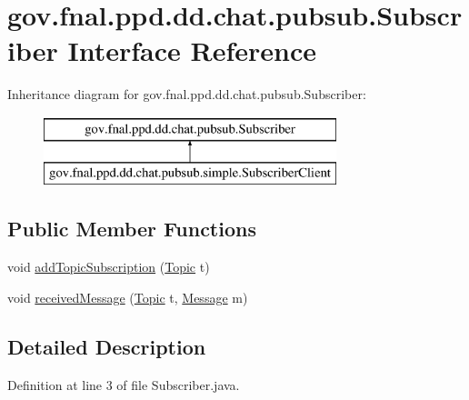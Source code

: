 \hypertarget{interfacegov_1_1fnal_1_1ppd_1_1dd_1_1chat_1_1pubsub_1_1Subscriber}{\section{gov.\-fnal.\-ppd.\-dd.\-chat.\-pubsub.\-Subscriber Interface Reference}
\label{interfacegov_1_1fnal_1_1ppd_1_1dd_1_1chat_1_1pubsub_1_1Subscriber}
}
Inheritance diagram for gov.\-fnal.\-ppd.\-dd.\-chat.\-pubsub.\-Subscriber\-:\begin{figure}[H]
\begin{center}
\leavevmode
\includegraphics[height=2.000000cm]{interfacegov_1_1fnal_1_1ppd_1_1dd_1_1chat_1_1pubsub_1_1Subscriber}
\end{center}
\end{figure}
\subsection*{Public Member Functions}
\begin{DoxyCompactItemize}
\item 
void \hyperlink{interfacegov_1_1fnal_1_1ppd_1_1dd_1_1chat_1_1pubsub_1_1Subscriber_a9bcf5b3ec57aa5c577b0b742d04e650d}{add\-Topic\-Subscription} (\hyperlink{classgov_1_1fnal_1_1ppd_1_1dd_1_1chat_1_1pubsub_1_1Topic}{Topic} t)
\item 
void \hyperlink{interfacegov_1_1fnal_1_1ppd_1_1dd_1_1chat_1_1pubsub_1_1Subscriber_ad8052428de568887f52d10cee5214484}{received\-Message} (\hyperlink{classgov_1_1fnal_1_1ppd_1_1dd_1_1chat_1_1pubsub_1_1Topic}{Topic} t, \hyperlink{interfacegov_1_1fnal_1_1ppd_1_1dd_1_1chat_1_1pubsub_1_1Message}{Message} m)
\end{DoxyCompactItemize}


\subsection{Detailed Description}


Definition at line 3 of file Subscriber.\-java.



